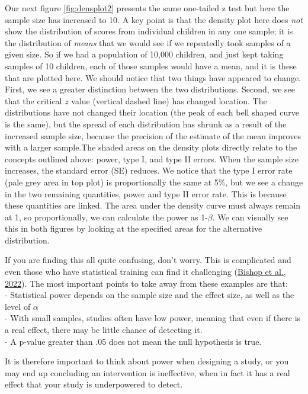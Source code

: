 \documentclass{krantz}
\begin{document}
Our next figure \ref{fig:densplot2} presents the same one-tailed z test but here the sample size has increased to 10. A key point is that the density plot here does \emph{not} show the distribution of scores from individual children in any one sample; it is the distribution of \emph{means} that we would see if we repeatedly took samples of a given size. So if we had a population of 10,000 children, and just kept taking samples of 10 children, each of those samples would have a mean, and it is these that are plotted here. We should notice that two things have appeared to change. First, we see a greater distinction between the two distributions. Second, we see that the critical \(z\) value (vertical dashed line) has changed location. The distributions have not changed their location (the peak of each bell shaped curve is the same), but the spread of each distribution has shrunk as a result of the increased sample size, because the precision of the estimate of the mean improves with a larger sample.The shaded areas on the density plots directly relate to the concepts outlined above: power, type I, and type II errors. When the sample size increases, the standard error (SE) reduces. We notice that the type I error rate (pale grey area in top plot) is proportionally the same at 5\%, but we see a change in the two remaining quantities, power and type II error rate. This is because these quantities are linked. The area under the density curve must always remain at 1, so proportionally, we can calculate the power as 1-\(\beta\). We can visually see this in both figures by looking at the specified areas for the alternative distribution.

If you are finding this all quite confusing, don't worry. This is complicated and even those who have statistical training can find it challenging (\protect\hyperlink{ref-bishop2022a}{Bishop et al., 2022}). The most important points to take away from these examples are that:\\
- Statistical power depends on the sample size and the effect size, as well as the level of \(\alpha\)\\
- With small samples, studies often have low power, meaning that even if there is a real effect, there may be little chance of detecting it.\\
- A p-value greater than .05 does not mean the null hypothesis is true.

It is therefore important to think about power when designing a study, or you may end up concluding an intervention is ineffective, when in fact it has a real effect that your study is underpowered to detect.
\end{document}
